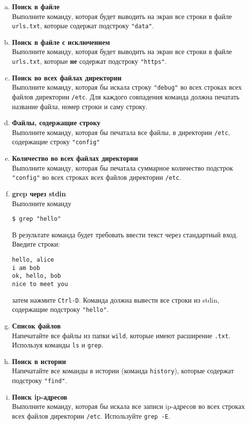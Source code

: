 \documentclass{article}
\begin{document}
\begin{enumerate}[a.]
\item \textbf{Поиск в файле}\\
Выполните команду, которая будет выводить на экран все строки в файле \texttt{urls.txt}, которые содержат подстроку \texttt{"data"}.

\item \textbf{Поиск в файле с исключением}\\
Выполните команду, которая будет выводить на экран все строки в файле \texttt{urls.txt}, которые \textbf{не} содержат подстроку \texttt{"https"}.

\item \textbf{Поиск во всех файлах директории}\\
Выполните команду, которая бы искала строку \texttt{"debug"} во всех строках всех файлов директории \texttt{/etc}. Для каждого совпадения команда должна печатать название файла, номер строки и саму строку.

\item \textbf{Файлы, содержащие строку}\\
Выполните команду, которая бы печатала все файлы, в директории \texttt{/etc}, содержащие строку \texttt{"config"} 

\item \textbf{Количество во всех файлах директории}\\
Выполните команду, которая бы печатала суммарное количество подстрок \texttt{"config"} во всех строках всех файлов директории \texttt{/etc}. 

\item \textbf{grep через stdin}\\
Выполните команду
\begin{lstlisting}
$ grep "hello"
\end{lstlisting}
В результате команда будет требовать ввести текст через стандартный вход. Введите строки:
\begin{lstlisting}
hello, alice
i am bob
ok, hello, bob
nice to meet you
\end{lstlisting}
затем нажмите \texttt{Ctrl-D}. Команда должна вывести все строки из stdin, содержащие подстроку \texttt{"hello"}.

\item \textbf{Список файлов}\\
Напечатайте все файлы из папки \texttt{wild}, которые имеют расширение \texttt{.txt}. Используя команды \texttt{ls} и \texttt{grep}.

\item \textbf{Поиск в истории}\\
Напечатайте все команды в истории (команда \texttt{history}), которые содержат подстроку \texttt{"find"}.

\item \textbf{Поиск ip-адресов}\\
Выполните команду, которая бы искала все записи ip-адресов во всех строках всех файлов директории \texttt{/etc}. Используйте \texttt{grep -E}.
\end{enumerate}
\end{document}
